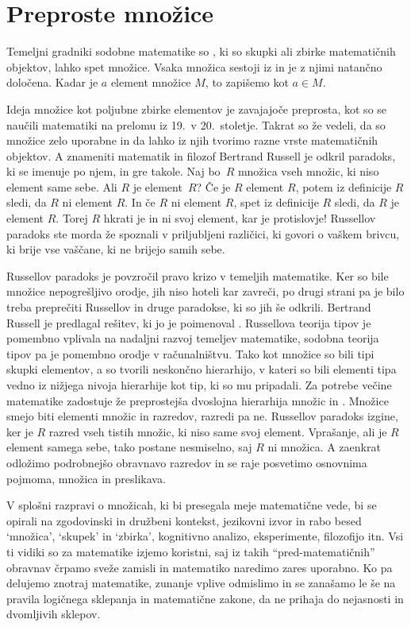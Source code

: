 \chapter{Preproste množice}
\label{cha:preproste-mnozice}


Temeljni gradniki sodobne matematike so , ki so skupki ali zbirke matematičnih
objektov, lahko spet množice. Vsaka množica sestoji iz  in je z njimi
natančno določena. Kadar je $a$ element množice $M$, to zapišemo kot $a \in M$.

Ideja množice kot poljubne zbirke elementov je zavajajoče preprosta, kot so se naučili
matematiki na prelomu iz 19.~v 20.~stoletje. Takrat so že vedeli, da so množice zelo
uporabne in da lahko iz njih tvorimo razne vrste matematičnih objektov. A znameniti
matematik in filozof Bertrand Russell je odkril paradoks, ki se imenuje po njem, in gre
takole. Naj bo~$R$ množica vseh množic, ki niso element same sebe. Ali $R$ je element~$R$?
Če je $R$ element $R$, potem iz definicije $R$ sledi, da $R$ ni element $R$. In če $R$ ni
element $R$, spet iz definicije $R$ sledi, da $R$ je element $R$. Torej $R$ hkrati je in
ni svoj element, kar je protislovje! Russellov paradoks ste morda že spoznali v
priljubljeni različici, ki govori o vaškem brivcu, ki brije vse vaščane, ki ne brijejo
samih sebe.

Russellov paradoks je povzročil pravo krizo v temeljih matematike. Ker so bile množice
nepogrešljivo orodje, jih niso hoteli kar zavreči, po drugi strani pa je bilo treba
preprečiti Russellov in druge paradokse, ki so jih še odkrili. Bertrand Russell je
predlagal rešitev, ki jo je poimenoval . Russellova teorija tipov je
pomembno vplivala na nadaljni razvoj temeljev matematike, sodobna teorija tipov pa je
pomembno orodje v računalništvu. Tako kot množice so bili tipi skupki elementov, a so
tvorili neskončno hierarhijo, v kateri so bili elementi tipa vedno iz nižjega nivoja
hierarhije kot tip, ki so mu pripadali. Za potrebe večine matematike zadostuje že
preprostejša dvoslojna hierarhija množic in . Množice smejo biti elementi
množic in razredov, razredi pa ne. Russellov paradoks izgine, ker je $R$ razred vseh
tistih množic, ki niso same svoj element. Vprašanje, ali je $R$ element samega sebe, tako
postane nesmiselno, saj $R$ ni množica. A zaenkrat odložimo podrobnejšo obravnavo razredov
in se raje posvetimo osnovnima pojmoma, množica in preslikava.

V splošni razpravi o množicah, ki bi presegala meje matematične vede, bi se opirali na
zgodovinski in družbeni kontekst, jezikovni izvor in rabo besed `množica', `skupek' in
`zbirka', kognitivno analizo, eksperimente, filozofijo itn. Vsi ti vidiki so za matematike
izjemo koristni, saj iz takih ``pred-matematičnih'' obravnav črpamo sveže zamisli in
matematiko naredimo zares uporabno. Ko pa delujemo znotraj matematike, zunanje vplive
odmislimo in se zanašamo le še na pravila logičnega sklepanja in matematične zakone, da ne
prihaja do nejasnosti in dvomljivih sklepov.

